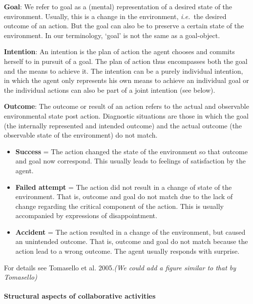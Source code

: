 \documentclass{article}
\newcommand{\ie}{{\textit{i.e.~}}}
\begin{document}
\textbf{Goal}: We refer to goal as a (mental) representation of a desired state
of the environment. Usually, this is a change in the environment, \ie the
desired outcome of an action. But the goal can also be to preserve a certain
state of the environment. In our terminology, `goal' is not the same as a
goal-object. 

\textbf{Intention}: An intention is the plan of action the agent chooses and
commits herself to in pursuit of a goal.  The plan of action thus encompasses
both the goal and the means to achieve it. The intention can be a purely
individual intention, in which the agent only represents his own means to
achieve an individual goal or the individual actions can also be part of a
joint intention (see below). 

\textbf{Outcome}: The outcome or result of an action refers to the actual and
observable environmental state post action. Diagnostic situations are those in
which the goal (the internally represented and intended outcome) and the actual
outcome (the observable state of the environment) do not match.

\begin{itemize}

\item \textbf{Success} = The action changed the state of the environment so that
outcome and goal now correspond.  This usually leads to feelings of
satisfaction by the agent.

\item \textbf{Failed attempt} = The action did not result in a change of state of the
environment. That is, outcome and goal do not match due to the lack of change
regarding the critical component of the action. This is usually accompanied by
expressions of disappointment.

\item \textbf{Accident} = The action resulted in a change of the environment, but
caused an unintended outcome. That is, outcome and goal do not match because
the action lead to a wrong outcome. The agent usually responds with surprise.

\end{itemize}

For details see Tomasello et al. 2005.\textit{(We could add a figure similar to
that by Tomasello)}

\paragraph{Structural aspects of collaborative activities}
\end{document}
